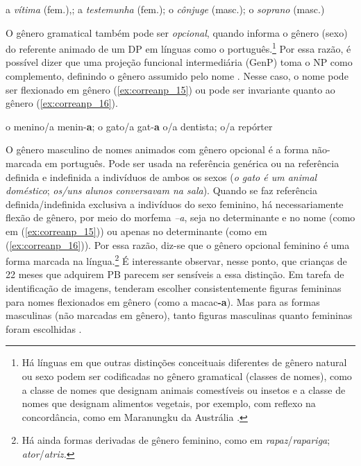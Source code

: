 \documentclass[output=paper]{LSP/langsci}
\begin{document}
\ea\label{ex:correanp_14}
a \textit{vítima} (fem.),; a \textit{testemunha} (fem.); o \textit{cônjuge} (masc.); o \textit{soprano} (masc.)
\z

O gênero gramatical também pode ser \textit{opcional}, quando informa o gênero (sexo) do referente animado de um DP em línguas como o português.\footnote{Há línguas em que outras distinções conceituais diferentes de gênero natural ou sexo podem ser codificadas no gênero gramatical (classes de nomes), como a classe de nomes que designam animais comestíveis ou insetos e a classe de nomes que designam alimentos vegetais, por exemplo, com reflexo na concordância, como em Maranungku da Austrália \citep{greenberg1978}.} Por essa razão, é possível dizer que uma projeção funcional intermediária (GenP) toma o NP como complemento, definindo o gênero assumido pelo nome \citep{picallo1991}. Nesse caso, o nome pode ser flexionado em gênero (\ref{ex:correanp_15}) ou pode ser invariante quanto ao gênero (\ref{ex:correanp_16}). 

\ea\label{ex:correanp_15}
o menino/a menin-\textbf{a}; o gato/a gat-\textbf{a}
\z
\ea\label{ex:correanp_16}
o/a dentista; o/a repórter
\z

O gênero masculino de nomes animados com gênero opcional é a forma não-marcada em português. Pode ser usada na referência genérica ou na referência definida e indefinida a indivíduos de ambos os sexos (\textit{o gato é um animal doméstico}; \textit{os/uns alunos conversavam na sala}). Quando se faz referência definida/indefinida exclusiva a indivíduos do sexo feminino, há necessariamente flexão de gênero, por meio do morfema \textit{–a}, seja no determinante e no nome (como em (\ref{ex:correanp_15})) ou apenas no determinante (como em (\ref{ex:correanp_16})). Por essa razão, diz-se que o gênero opcional feminino é uma forma marcada na língua.\footnote{Há ainda formas derivadas de gênero feminino, como em \textit{rapaz}/\textit{rapariga}; \textit{ator}/\textit{atriz.}} É interessante observar, nesse ponto, que crianças de 22 meses que adquirem PB parecem ser sensíveis a essa distinção. Em tarefa de identificação de imagens, tenderam escolher consistentemente figuras femininas para nomes flexionados em gênero (como a macac\textbf{-a}). Mas para as formas masculinas (não marcadas em gênero), tanto figuras masculinas quanto femininas foram escolhidas \citep{augustocorrea2005}.
\end{document}
